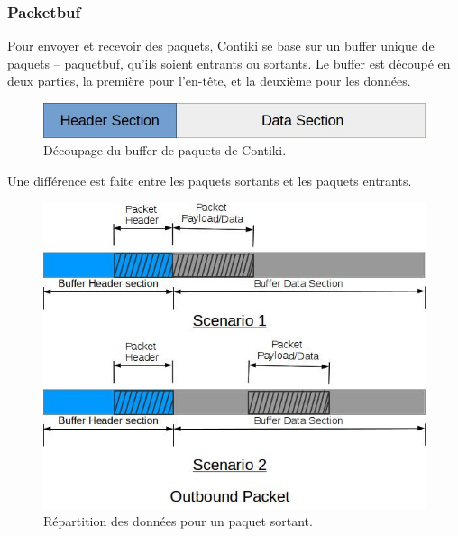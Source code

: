 		\subsubsection{Packetbuf}
		
			Pour envoyer et recevoir des paquets, Contiki se base sur un buffer unique de paquets -- paquetbuf, qu'ils soient entrants ou sortants.
			Le buffer est découpé en deux parties, la première pour l'en-tête, et la deuxième pour les données.
			
			\begin{figure}[htp]
				\centering
				\includegraphics[width=12cm]{images/Buf.jpg}
				\caption{Découpage du buffer de paquets de Contiki.}
				\label{fig:buf}
			\end{figure}
			
			Une différence est faite entre les paquets sortants et les paquets entrants.
			
			\clearpage
			\begin{figure}[htp]
				\centering
				\includegraphics[width=13cm]{images/Out.jpg}
				\caption{Répartition des données pour un paquet sortant.}
				\label{fig:outbuf}
			\end{figure}
			

